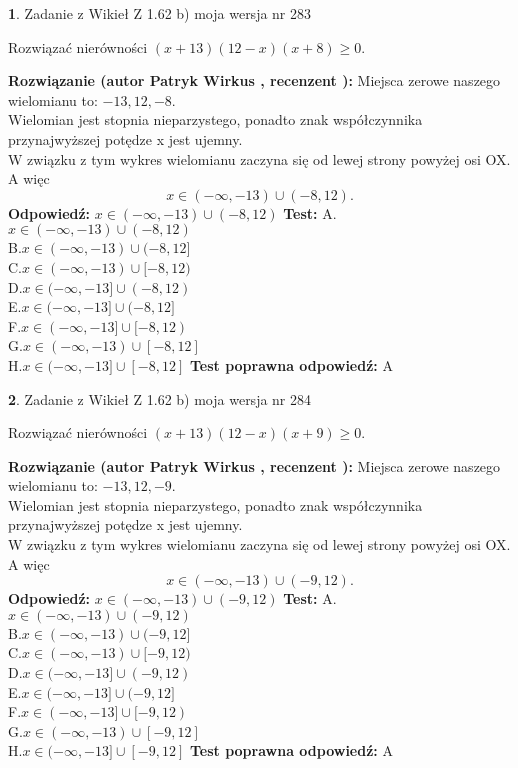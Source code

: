 \documentclass[12pt, a4paper]{article}
\theoremstyle{definition} %
\newtheorem{zad}{}
\newcommand{\zadStart}[1]{\begin{zad}#1\newline}
\newcommand{\zadStop}{\end{zad}}
\newcommand{\rozwStart}[2]{\noindent \textbf{Rozwiązanie (autor #1 , recenzent #2): }\newline}
\newcommand{\rozwStop}{\newline}
\newcommand{\odpStart}{\noindent \textbf{Odpowiedź:}\newline}
\newcommand{\odpStop}{\newline}
\newcommand{\testStart}{\noindent \textbf{Test:}\newline}
\newcommand{\testStop}{\newline}
\newcommand{\kluczStart}{\noindent \textbf{Test poprawna odpowiedź:}\newline}
\newcommand{\kluczStop}{\newline}
\begin{document}
\zadStart{Zadanie z Wikieł Z 1.62 b) moja wersja nr 283}

Rozwiązać nierówności $(x+13)(12-x)(x+8)\ge0$.
\zadStop
\rozwStart{Patryk Wirkus}{}
Miejsca zerowe naszego wielomianu to: $-13, 12, -8$.\\
Wielomian jest stopnia nieparzystego, ponadto znak współczynnika przy\linebreak najwyższej potędze x jest ujemny.\\ W związku z tym wykres wielomianu zaczyna się od lewej strony powyżej osi OX. A więc $$x \in (-\infty,-13) \cup (-8,12).$$
\rozwStop
\odpStart
$x \in (-\infty,-13) \cup (-8,12)$
\odpStop
\testStart
A.$x \in (-\infty,-13) \cup (-8,12)$\\
B.$x \in (-\infty,-13) \cup (-8,12]$\\
C.$x \in (-\infty,-13) \cup [-8,12)$\\
D.$x \in (-\infty,-13] \cup (-8,12)$\\
E.$x \in (-\infty,-13] \cup (-8,12]$\\
F.$x \in (-\infty,-13] \cup [-8,12)$\\
G.$x \in (-\infty,-13) \cup [-8,12]$\\
H.$x \in (-\infty,-13] \cup [-8,12]$
\testStop
\kluczStart
A
\kluczStop



\zadStart{Zadanie z Wikieł Z 1.62 b) moja wersja nr 284}

Rozwiązać nierówności $(x+13)(12-x)(x+9)\ge0$.
\zadStop
\rozwStart{Patryk Wirkus}{}
Miejsca zerowe naszego wielomianu to: $-13, 12, -9$.\\
Wielomian jest stopnia nieparzystego, ponadto znak współczynnika przy\linebreak najwyższej potędze x jest ujemny.\\ W związku z tym wykres wielomianu zaczyna się od lewej strony powyżej osi OX. A więc $$x \in (-\infty,-13) \cup (-9,12).$$
\rozwStop
\odpStart
$x \in (-\infty,-13) \cup (-9,12)$
\odpStop
\testStart
A.$x \in (-\infty,-13) \cup (-9,12)$\\
B.$x \in (-\infty,-13) \cup (-9,12]$\\
C.$x \in (-\infty,-13) \cup [-9,12)$\\
D.$x \in (-\infty,-13] \cup (-9,12)$\\
E.$x \in (-\infty,-13] \cup (-9,12]$\\
F.$x \in (-\infty,-13] \cup [-9,12)$\\
G.$x \in (-\infty,-13) \cup [-9,12]$\\
H.$x \in (-\infty,-13] \cup [-9,12]$
\testStop
\kluczStart
A
\kluczStop
\end{document}
